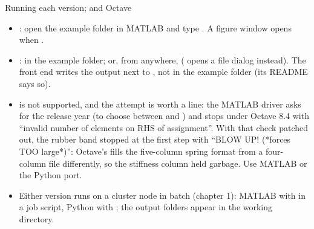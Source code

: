 \documentclass[aspectratio=169,11pt]{beamer}
\begin{document}
\begin{frame}{Running each version; and Octave}
\label{fr:octave}
\small
\begin{itemize}
  \item {}: open the example folder in MATLAB and type . A figure window opens when .
  \item {}:  in the example folder; or, from anywhere,  ( opens a file dialog instead). The front end writes the output next to , not in the example folder (its README says so).
  \item {} is not supported, and the attempt is worth a line: the MATLAB driver asks  for the release year (to choose between  and ) and stops under Octave 8.4 with ``invalid number of elements on RHS of assignment''. With that check patched out, the rubber band stopped at the first step with ``BLOW UP! (*forces TOO large*)'': Octave's  fills the five-column spring format from a four-column file differently, so the stiffness column held garbage. Use MATLAB or the Python port.
  \item Either version runs on a cluster node in batch (chapter 1): MATLAB with  in a job script, Python with ; the output folders appear in the working directory.
\end{itemize}
\end{frame}
\end{document}
